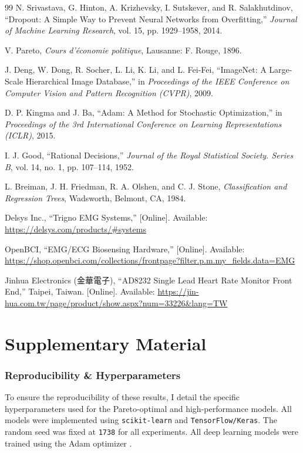 \documentclass{article}
\begin{document}
\begin{thebibliography}{99}
N. Srivastava, G. Hinton, A. Krizhevsky, I. Sutskever, and R. Salakhutdinov,
``Dropout: A Simple Way to Prevent Neural Networks from Overfitting,''
\textit{Journal of Machine Learning Research}, vol. 15, pp. 1929--1958, 2014.

V. Pareto,
\textit{Cours d'économie politique},
Lausanne: F. Rouge, 1896.

J. Deng, W. Dong, R. Socher, L. Li, K. Li, and L. Fei-Fei,
``ImageNet: A Large-Scale Hierarchical Image Database,''
in \textit{Proceedings of the IEEE Conference on Computer Vision and Pattern Recognition (CVPR)}, 2009.

D. P. Kingma and J. Ba,
``Adam: A Method for Stochastic Optimization,''
in \textit{Proceedings of the 3rd International Conference on Learning Representations (ICLR)}, 2015.

I. J. Good,
``Rational Decisions,''
\textit{Journal of the Royal Statistical Society. Series B}, vol. 14, no. 1, pp. 107--114, 1952.

L. Breiman, J. H. Friedman, R. A. Olshen, and C. J. Stone,
\textit{Classification and Regression Trees},
Wadsworth, Belmont, CA, 1984.

Delsys Inc.,
``Trigno EMG Systems,''
[Online]. Available: \url{https://delsys.com/products/#systems}

OpenBCI,
``EMG/ECG Biosensing Hardware,''
[Online]. Available: \url{https://shop.openbci.com/collections/frontpage?filter.p.m.my_fields.data=EMG}

Jinhua Electronics (金華電子),
``AD8232 Single Lead Heart Rate Monitor Front End,''
Taipei, Taiwan. [Online]. Available: \url{https://jin-hua.com.tw/page/product/show.aspx?num=33226&lang=TW}

\end{thebibliography}
\appendix

\part*{Supplementary Material}

\section{Reproducibility \& Hyperparameters}
\label{app:hyperparams}

To ensure the reproducibility of these results, I detail the specific hyperparameters used for the Pareto-optimal and high-performance models. All models were implemented using \texttt{scikit-learn} and \texttt{TensorFlow/Keras}. The random seed was fixed at \texttt{1738} for all experiments. All deep learning models were trained using the Adam optimizer \cite{adam}.
\end{document}
